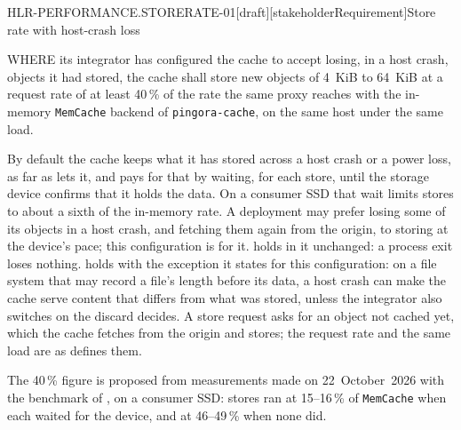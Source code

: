 \begin{requirement}{HLR-PERFORMANCE.STORERATE-01}[draft][stakeholderRequirement]{Store rate with host-crash loss}


  WHERE its integrator has configured the cache to accept losing, in a host
  crash, objects it had stored, the cache shall store new objects of 4~KiB to
  64~KiB at a request rate of at least 40\,\% of the rate the same proxy
  reaches with the in-memory \texttt{MemCache} backend of
  \texttt{pingora-cache}, on the same host under the same load.

  By default the cache keeps what it has stored across a host crash or a
  power loss, as far as  lets it, and
  pays for that by waiting, for each store, until the storage device confirms
  that it holds the data. On a consumer SSD that wait limits stores to about
  a sixth of the in-memory rate. A deployment may prefer losing some of its
  objects in a host crash, and fetching them again from the origin, to
  storing at the device's pace; this configuration is for it.
   holds in it unchanged: a process exit
  loses nothing.  holds with the
  exception it states for this configuration: on a file system that may
  record a file's length before its data, a host crash can make the cache
  serve content that differs from what was stored, unless the integrator
  also switches on the discard 
  decides. A
  store request asks for an object not cached yet, which the
  cache fetches from the origin and stores; the request rate and the same
  load are as  defines them.

  The 40\,\% figure is proposed from measurements made on 22~October~2026
  with the benchmark of , on a consumer
  SSD: stores ran at 15--16\,\% of \texttt{MemCache} when each waited for the
  device, and at 46--49\,\% when none did.


\end{requirement}

